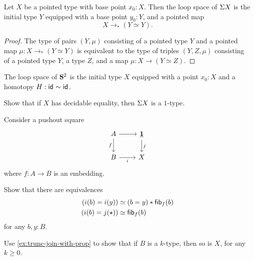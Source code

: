 \begin{thm}
  Let $X$ be a pointed type with base point $x_0:X$. Then the loop space of $\Sigma{X}$ is the initial type $Y$ equipped with a base point $y_0:Y$, and a pointed map
  \begin{equation*}
    X \to_\ast (Y\simeq Y).
  \end{equation*}
\end{thm}

\begin{proof}
  The type of pairs $(Y,\mu)$ consisting of a pointed type $Y$ and a pointed map $\mu:X\to_\ast (Y \simeq Y)$ is equivalent to the type of triples $(Y,Z,\mu)$ consisting of a pointed type $Y$, a type $Z$, and a map $\mu:X\to (Y\simeq Z)$.  
\end{proof}

\begin{cor}
  The loop space of $\mathbf{S}^{2}$ is the initial type $X$ equipped with a point $x_0:X$ and a homotopy $H:\mathsf{id}_{}\sim\mathsf{id}_{}$.
\end{cor}

\begin{exercises}
\item Show that if $X$ has decidable equality, then $\Sigma{X}$ is a $1$-type.
\item Consider a pushout square
  \begin{equation*}
    \begin{tikzcd}
      A \arrow[r] \arrow[d,swap,"f"] & \unit \arrow[d,"j"] \\
      B \arrow[r,swap,"i"] & X
    \end{tikzcd}
  \end{equation*}
  where $f:A\to B$ is an embedding.
  \begin{subexenum}
  \item Show that there are equivalences
  \begin{align*}
    (i(b)=i(y)) & \simeq (b=y)\ast \mathsf{fib}_{f}(b) \\
    (i(b)=j(\star)) & \simeq \mathsf{fib}_{f}(b)
  \end{align*}
  for any $b,y:B$.
  \item Use \cref{ex:trunc-join-with-prop} to show that if $B$ is a $k$-type, then so is $X$, for any $k\geq 0$.
  \end{subexenum}
\end{exercises}
